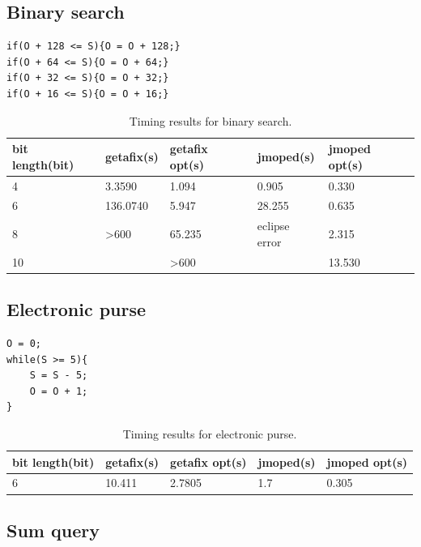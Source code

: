\subsection{Binary search}

\lstset{language=C}  
\begin{lstlisting}[caption={Binary search test program at 8 bits.},label=lst:bin]
if(O + 128 <= S){O = O + 128;}
if(O + 64 <= S){O = O + 64;}
if(O + 32 <= S){O = O + 32;}
if(O + 16 <= S){O = O + 16;}
\end{lstlisting}

\begin{table}[htbp]
\begin{tabular}{|l|l|l|l|l|}
\hline
{bit length(bit)} & getafix(s) & {getafix opt(s)} & jmoped(s) & {jmoped opt(s)} \\ \hline
4 & 3.3590 & 1.094 & 0.905 & 0.330 \\ \hline
6 & 136.0740 & 5.947 & 28.255 & 0.635 \\ \hline
8 & \textgreater 600 & 65.235 & eclipse error & 2.315 \\ \hline
10 &  & \textgreater 600 &  & 13.530 \\ \hline
\end{tabular}
\caption{Timing results for binary search.}
\label{tbl:bin}
\end{table}

\subsection{Electronic purse}

\lstset{language=C}  
\begin{lstlisting}[caption={Electronic purse test program.},label=lst:electronic]
O = 0;
while(S >= 5){
	S = S - 5;
	O = O + 1;
}
\end{lstlisting}

\begin{table}[htbp]
\begin{tabular}{|l|l|l|l|l|}
\hline
{bit length(bit)} & getafix(s) & {getafix opt(s)} & jmoped(s) & {jmoped opt(s)} \\ \hline
{6} & {10.411} & {2.7805} & {1.7} & {0.305} \\ \hline
\end{tabular}
\caption{Timing results for electronic purse.}
\label{tbl:electronic}
\end{table}

\subsection{Sum query}


